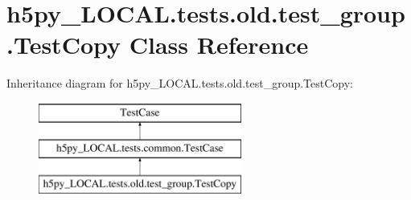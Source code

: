 \hypertarget{classh5py__LOCAL_1_1tests_1_1old_1_1test__group_1_1TestCopy}{}\section{h5py\+\_\+\+L\+O\+C\+A\+L.\+tests.\+old.\+test\+\_\+group.\+Test\+Copy Class Reference}
\label{classh5py__LOCAL_1_1tests_1_1old_1_1test__group_1_1TestCopy}
Inheritance diagram for h5py\+\_\+\+L\+O\+C\+A\+L.\+tests.\+old.\+test\+\_\+group.\+Test\+Copy\+:\begin{figure}[H]
\begin{center}
\leavevmode
\includegraphics[height=3.000000cm]{classh5py__LOCAL_1_1tests_1_1old_1_1test__group_1_1TestCopy}
\end{center}
\end{figure}
